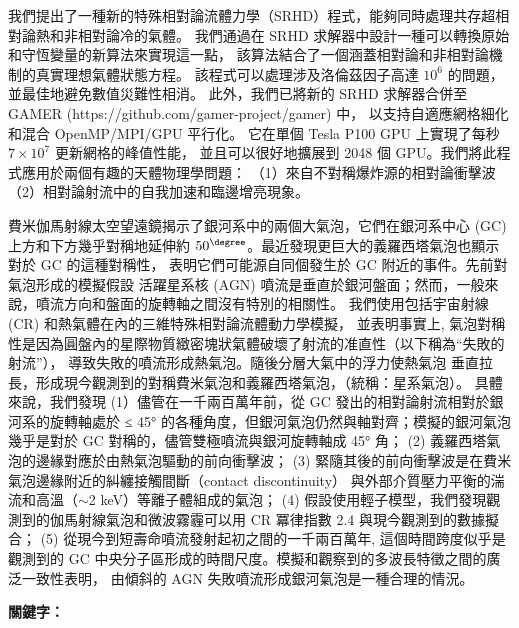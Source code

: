 \begin{abstractzh}
{我們提出了一種新的特殊相對論流體力學（SRHD）程式，能夠同時處理共存超相對論熱和非相對論冷的氣體。
我們通過在 SRHD 求解器中設計一種可以轉換原始和守恆變量的新算法來實現這一點，
該算法結合了一個涵蓋相對論和非相對論機制的真實理想氣體狀態方程。
該程式可以處理涉及洛倫茲因子高達 $10^6$ 的問題，並最佳地避免數值災難性相消。
此外，我們已將新的 SRHD 求解器合併至 GAMER (https://github.com/gamer-project/gamer) 中，
以支持自適應網格細化和混合 OpenMP/MPI/GPU 平行化。
它在單個 Tesla P100 GPU 上實現了每秒 $7\times10^7$ 更新網格的峰值性能，
並且可以很好地擴展到 2048 個 GPU。我們將此程式應用於兩個有趣的天體物理學問題：
（1）來自不對稱爆炸源的相對論衝擊波（2）相對論射流中的自我加速和臨邊增亮現象。

費米伽馬射線太空望遠鏡揭示了銀河系中的兩個大氣泡，它們在銀河系中心 (GC)
上方和下方幾乎對稱地延伸約 $50^\degree$。最近發現更巨大的義羅西塔氣泡也顯示對於 GC 的這種對稱性，
表明它們可能源自同個發生於 GC 附近的事件。先前對氣泡形成的模擬假設
活躍星系核 (AGN) 噴流是垂直於銀河盤面；然而，一般來說，噴流方向和盤面的旋轉軸之間沒有特別的相關性。
我們使用包括宇宙射線 (CR) 和熱氣體在內的三維特殊相對論流體動力學模擬，
並表明事實上, 氣泡對稱性是因為圓盤內的星際物質緻密塊狀氣體破壞了射流的准直性（以下稱為“失敗的射流”），
導致失敗的噴流形成熱氣泡。隨後分層大氣中的浮力使熱氣泡
垂直拉長，形成現今觀測到的對稱費米氣泡和義羅西塔氣泡，（統稱：星系氣泡）。
具體來說，我們發現
(1）儘管在一千兩百萬年前，從 GC 發出的相對論射流相對於銀河系的旋轉軸處於 ≤ 45°
的各種角度，但銀河氣泡仍然與軸對齊；模擬的銀河氣泡幾乎是對於 GC 對稱的，儘管雙極噴流與銀河旋轉軸成 45° 角；
(2) 義羅西塔氣泡的邊緣對應於由熱氣泡驅動的前向衝擊波；
(3) 緊隨其後的前向衝擊波是在費米氣泡邊緣附近的糾纏接觸間斷（contact discontinuity）
與外部介質壓力平衡的湍流和高溫（$\sim$2 keV）等離子體組成的氣泡；
(4) 假設使用輕子模型，我們發現觀測到的伽馬射線氣泡和微波霧霾可以用 CR 冪律指數 2.4 與現今觀測到的數據擬合；
(5) 從現今到短壽命噴流發射起初之間的一千兩百萬年, 這個時間跨度似乎是觀測到的 GC
中央分子區形成的時間尺度。模擬和觀察到的多波長特徵之間的廣泛一致性表明，
由傾斜的 AGN 失敗噴流形成銀河氣泡是一種合理的情況。}
\bigbreak
\noindent \textbf{關鍵字：}{\, \makeatletter \@keywordszh \makeatother}
\end{abstractzh}

